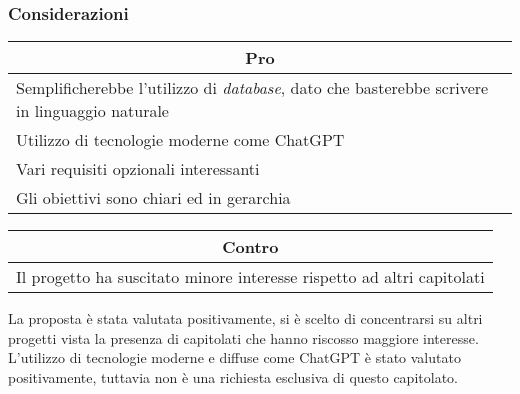 \subsubsection{Considerazioni}
\begin{minipage}[t]{0.45\linewidth}
    \vspace{0pt}
    {\renewcommand{\arraystretch}{1.5}
    \begin{tabular}{p{1\linewidth}}
        \multicolumn{1}{c}{\textbf{Pro}} \\
        \midrule
        Semplificherebbe l'utilizzo di \textit{database}, dato che basterebbe scrivere in linguaggio naturale \\
        Utilizzo di tecnologie moderne come ChatGPT \\
        Vari requisiti opzionali interessanti \\
        Gli obiettivi sono chiari ed in gerarchia \\
        \hline
    \end{tabular}
    }
\end{minipage}
\hspace{0.05\linewidth}
\begin{minipage}[t]{0.45\linewidth}
    \vspace{0pt}
    {\renewcommand{\arraystretch}{1.5}
    \begin{tabular}{p{1\linewidth}}
        \multicolumn{1}{c}{\textbf{Contro}} \\
        \midrule
        Il progetto ha suscitato minore interesse rispetto ad altri capitolati \\
        \hline
    \end{tabular}
    }
\end{minipage}
\vspace{1em}

La proposta è stata valutata positivamente, si è scelto di concentrarsi su altri progetti vista la presenza di capitolati che hanno riscosso maggiore interesse.
L'utilizzo di tecnologie moderne e diffuse come ChatGPT è stato valutato positivamente, tuttavia non è una richiesta esclusiva di questo capitolato.